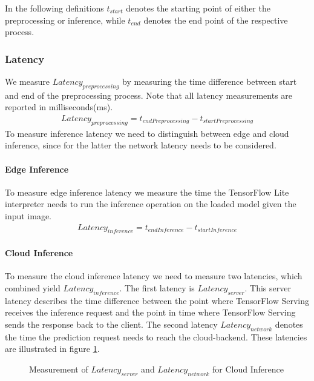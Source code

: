 In the following definitions $t_{start}$ denotes the starting point of either the preprocessing or inference, while $t_{end}$ denotes the end point of the respective process.
\subsubsection{Latency}
We measure $Latency_{preprocessing}$ by measuring the time difference between start and end of the preprocessing process.
Note that all latency measurements are reported in milliseconds(ms).
\begin{equation*}
\begin{gathered}
Latency_{preprocessing} = t_{endPreprocessing} - t_{startPreprocessing}
\end{gathered}
\end{equation*}
To measure inference latency we need to distinguish between edge and cloud inference, since for the latter the network latency needs to be considered.

\paragraph{Edge Inference}To measure edge inference latency we measure the time the TensorFlow Lite interpreter needs to run the inference operation on the loaded model given the input image.
\begin{equation*}
\begin{gathered}
Latency_{inference} = t_{endInference} - t_{startInference}
\end{gathered}
\end{equation*}
\paragraph{Cloud Inference}
To measure the cloud inference latency we need to measure two latencies, which combined yield $Latency_{inference}$. The first latency is  $Latency_{server}$. This server latency describes the time difference between the point where TensorFlow Serving receives the inference request and the point in time where TensorFlow Serving sends the response back to the client.
The second latency $Latency_{network}$ denotes the time the prediction request needs to reach the cloud-backend.
These latencies are illustrated in figure \ref{fig:serverLat}.
\begin{figure}[!htb]
\centering

\caption{Measurement of $Latency_{server}$ and $Latency_{network}$ for Cloud Inference}
\label{fig:serverLat}
\end{figure}


